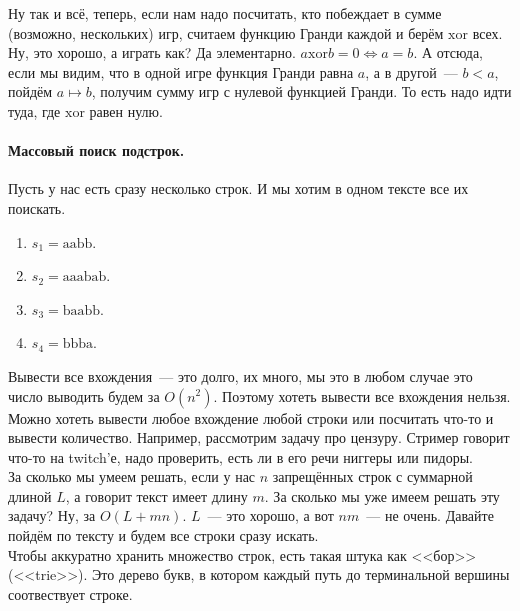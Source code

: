 \documentclass{article}
\begin{document}
    Ну так и всё, теперь, если нам надо посчитать, кто побеждает в сумме (возможно, нескольких) игр, считаем функцию Гранди каждой и берём $\mathrm{xor}$ всех. Ну, это хорошо, а играть как? Да элементарно. $a\mathbin{\mathrm{xor}}b=0\Leftrightarrow a=b$. А отсюда, если мы видим, что в одной игре функция Гранди равна $a$, а в другой~--- $b<a$, пойдём $a\mapsto b$, получим сумму игр с нулевой функцией Гранди. То есть надо идти туда, где $\mathrm{xor}$ равен нулю.
    
    \pagebreak
    \paragraph{Массовый поиск подстрок.}
    Пусть у нас есть сразу несколько строк. И мы хотим в одном тексте все их поискать.
    \begin{enumerate}
        \item $s_1=\mathrm{aabb}$.
        \item $s_2=\mathrm{aaabab}$.
        \item $s_3=\mathrm{baabb}$.
        \item $s_4=\mathrm{bbba}$.
    \end{enumerate}
    Вывести все вхождения~--- это долго, их много, мы это в любом случае это число выводить будем за $O(n^2)$. Поэтому хотеть вывести все вхождения нельзя. Можно хотеть вывести любое вхождение любой строки или посчитать что-то и вывести количество. Например, рассмотрим задачу про цензуру. Стример говорит что-то на twitch'е, надо проверить, есть ли в его речи ниггеры или пидоры.\\
    За сколько мы умеем решать, если у нас $n$ запрещённых строк с суммарной длиной $L$, а говорит текст имеет длину $m$. За сколько мы уже имеем решать эту задачу? Ну, за $O(L+mn)$. $L$~--- это хорошо, а вот $nm$~--- не очень. Давайте пойдём по тексту и будем все строки сразу искать.\\
    Чтобы аккуратно хранить множество строк, есть такая штука как <<бор>> (<<trie>>). Это дерево букв, в котором каждый путь до терминальной вершины соотвествует строке.
    \begin{figure}[H]
    \end{figure}\noindent
\end{document}
